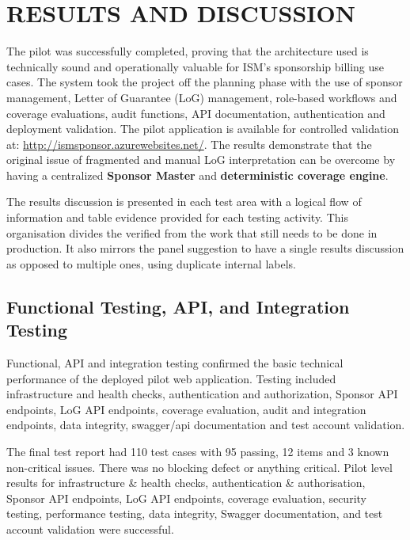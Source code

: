 
\section{RESULTS AND DISCUSSION}

The pilot was successfully completed, proving that the architecture used is technically sound and operationally valuable for ISM's sponsorship billing use cases. The system took the project off the planning phase with the use of sponsor management, Letter of Guarantee (LoG) management, role-based workflows and coverage evaluations, audit functions, API documentation, authentication and deployment validation. The pilot application is available for controlled validation at: \url{http://ismsponsor.azurewebsites.net/}. The results demonstrate that the original issue of fragmented and manual LoG interpretation can be overcome by having a centralized \textbf{Sponsor Master} and \textbf{deterministic coverage engine}.

The results discussion is presented in each test area with a logical flow of information and table evidence provided for each testing activity. This organisation divides the verified from the work that still needs to be done in production. It also mirrors the panel suggestion to have a single results discussion as opposed to multiple ones, using duplicate internal labels.

\subsection{Functional Testing, API, and Integration Testing}

Functional, API and integration testing confirmed the basic technical performance of the deployed pilot web application. Testing included infrastructure and health checks, authentication and authorization, Sponsor API endpoints, LoG API endpoints, coverage evaluation, audit and integration endpoints, data integrity, swagger/api documentation and test account validation.

The final test report had 110 test cases with 95 passing, 12 items and 3 known non-critical issues. There was no blocking defect or anything critical. Pilot level results for infrastructure \& health checks, authentication \& authorisation, Sponsor API endpoints, LoG API endpoints, coverage evaluation, security testing, performance testing, data integrity, Swagger documentation, and test account validation were successful.

